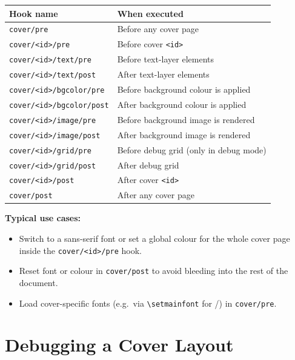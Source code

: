 \begin{center}
\begin{tabular}{ll}
  \hline
  \textbf{Hook name}              & \textbf{When executed} \\
  \hline
  \texttt{cover/pre}              & Before any cover page \\
  \texttt{cover/<id>/pre}         & Before cover \texttt{<id>} \\
  \texttt{cover/<id>/text/pre}    & Before text-layer elements \\
  \texttt{cover/<id>/text/post}   & After text-layer elements \\
  \texttt{cover/<id>/bgcolor/pre} & Before background colour is applied \\
  \texttt{cover/<id>/bgcolor/post}& After background colour is applied \\
  \texttt{cover/<id>/image/pre}   & Before background image is rendered \\
  \texttt{cover/<id>/image/post}  & After background image is rendered \\
  \texttt{cover/<id>/grid/pre}    & Before debug grid (only in debug mode) \\
  \texttt{cover/<id>/grid/post}   & After debug grid \\
  \texttt{cover/<id>/post}        & After cover \texttt{<id>} \\
  \texttt{cover/post}             & After any cover page \\
  \hline
\end{tabular}
\end{center}

\medskip
\noindent\textbf{Typical use cases:}
\begin{itemize}
  \item Switch to a sans-serif font or set a global colour for the whole cover
        page inside the \texttt{cover/<id>/pre} hook.
  \item Reset font or colour in \texttt{cover/post} to avoid bleeding into the
        rest of the document.
  \item Load cover-specific fonts (e.g.\ via \verb!\setmainfont! for
        /) in \texttt{cover/pre}.
\end{itemize}


\section{Debugging a Cover Layout}
\label{sec:covers_debug}

